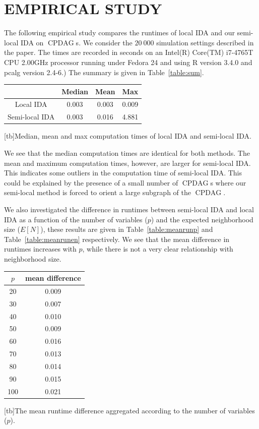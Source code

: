 \documentclass[letterpaper]{article}
\theoremstyle{definition}
\theoremstyle{remark}
\DeclareMathOperator{\CPDAG}{CPDAG}
\begin{document}
\section{EMPIRICAL STUDY} \label{sec:study}

The following empirical study compares the runtimes of local IDA and our semi-local IDA on $\CPDAG$s.
We consider the $20\ 000$ simulation settings described in the paper. The times are recorded in seconds on an Intel(R) Core(TM) i7-4765T CPU \@ 2.00GHz processor running under Fedora 24 and using R version 3.4.0 and pcalg version 2.4-6.)
The summary is given in Table~\ref{table:sum}.
\begin{center}
\begin{tabular}{ |c|c|c|c| } 
 \hline
				& 	Median	& Mean		& Max \\ \hline 
 Local IDA 		& 	0.003	& 0.003		& 0.009 \\ \hline 
 Semi-local IDA &   0.003	& 0.016		& 4.881 \\ 
 \hline
\end{tabular}
[tb]{Median, mean and max computation times of local IDA and semi-local IDA.}
 \label{table:sum}
\end{center}
We see that the median computation times are identical for both methods. The mean and maximum computation times, however, are larger for semi-local IDA. This indicates some outliers in the computation time of semi-local IDA. This could be explained by the presence of a small number of $\CPDAG$s where our semi-local method is forced to orient a large subgraph of the $\CPDAG$. 

We also investigated the difference in runtimes between semi-local IDA and local IDA as a function of the number of variables ($p$) and the expected neighborhood size ($E[N]$), these results are given in Table~\ref{table:meanrunp} and Table~\ref{table:meanrunen} respectively.
We see that the mean difference in runtimes increases with $p$, while there is not a very clear relationship with neighborhood size.


\begin{center}
\begin{tabular}{ |c|c| } 
 \hline
 $p$ 		& 	mean difference \\ \hline 
 20	  &	0.009 	\\ \hline
30	& 	0.007  \\	\hline
40	& 	0.010 \\\hline
50	& 	0.009 \\\hline
60	& 	0.016 	\\		\hline 
70	& 	0.013 \\\hline
80	&	0.014 	\\\hline
90	&	0.015 	\\\hline
100	& 	0.021\\
 \hline
\end{tabular}
[tb]{The mean runtime difference aggregated according to the number of variables ($p$).}
\label{table:meanrunp}
\end{center}
\end{document}
